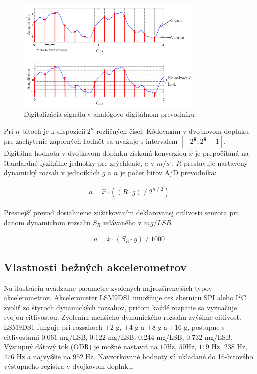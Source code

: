 \begin{figure}[h]
	\centering
	\includegraphics[width=0.8\textwidth]{figures/analysis/analog-to-digital-conversion.png}
	\caption{Digitalizácia signálu v analógovo-digitálnom prevodníku \cite{music-processing}}
\end{figure}
Pri $n$ bitoch je k dispozícii $2^n$ rozličných čísel. Kódovaním v dvojkovom doplnku pre zachytenie záporných hodnôt
sa uvažuje s intervalom $[-2^\frac{n}{2}; 2^\frac{n}{2} - 1]$. Digitálna hodnota v dvojkovom doplnku získanú konverziou
$\hat{x}$ je prepočítaná na štandardné fyzikálne jednotky pre zrýchlenie, $a$ v $m/s^2$. $R$ prestavuje nastavený
dynamický rozsah v jednotkách $g$ a $n$ je počet bitov A/D prevodníka:
\begin{ceqn}\begin{align}
   a = \hat{x} \cdot ((R \cdot g)\;/\;2^{n\;/\;2})
\end{align}\end{ceqn}

Presnejší prevod dosiahneme zužitkovaním deklarovanej citlivosti senzora pri danom dynamickom rozsahu $S_R$ udávaného v $mg/LSB$.
\begin{ceqn}\begin{align}
   a = \hat{x} \cdot (S_R \cdot g)\;/\;1000
\end{align}\end{ceqn}

\subsection{Vlastnosti bežných akcelerometrov} \label{section:accelometers}
Na ilustráciu uvádzame parametre zvolených najrozšírenejších typov akcelerometrov. Akcelerometer LSM9DS1 \cite{lsm9ds1} umožňuje cez
zbernicu SPI alebo I$^\mathrm{2}$C zvoliť zo štyroch dynamických rozsahov, pričom každé rozpätie sa vyznačuje svojou
citlivosťou. Zvolením menšieho dynamického rozsahu zvýšime citlivosť. LSM9DS1 funguje pri rozsahoch 
$\pm2$ g, $\pm4$ g a $\pm8$ g a $\pm16$ g, postupne s citlivosťami
$0.061$ mg/LSB, $0.122$ mg/LSB, $0.244$ mg/LSB, $0.732$ mg/LSB. Výstupný dátový tok (ODR) je možné nastaviť na $10$Hz, $50$Hz,
$119$ Hz, $238$ Hz, $476$ Hz a najvyššie na $952$ Hz. Navzorkované hodnoty sú ukladané do 16-bitového výstupného registra v
dvojkovom doplnku.

